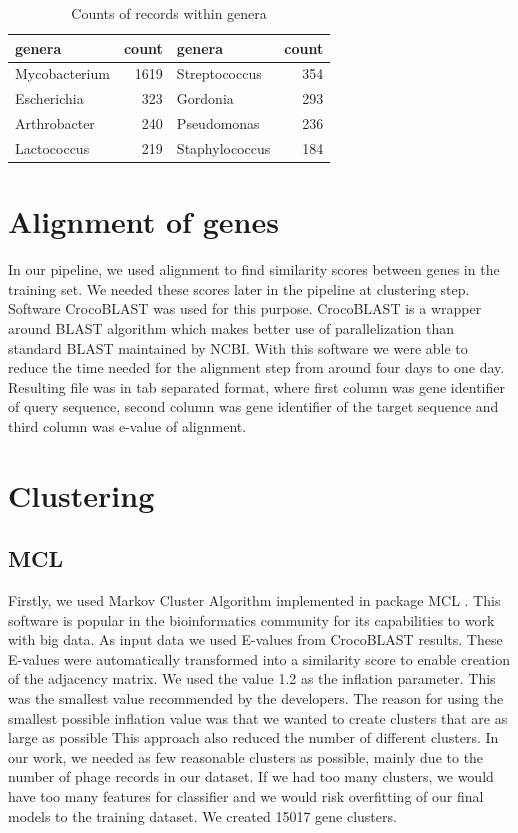 \begin{table}
 \centering
        \begin{tabular}{ l  r  l  r }
         \hline
         genera & count & genera & count \\
         \hline
         Mycobacterium & 1619 & Streptococcus & 354 \\
         Escherichia & 323 & Gordonia & 293 \\
         Arthrobacter & 240 & Pseudomonas & 236 \\
         Lactococcus & 219 & Staphylococcus & 184 \\
         \hline
        \end{tabular}
        \caption{Counts of records within genera}
        \label{tab:counts}
\end{table}

\section{Alignment of genes}
In our pipeline, we used alignment to find similarity scores between genes in the training set.
We needed these scores later in the pipeline at clustering step.
Software CrocoBLAST \cite{crocoblast} was used for this purpose.
CrocoBLAST is a wrapper around BLAST algorithm which makes better use of parallelization than standard BLAST maintained by NCBI.
With this software we were able to reduce the time needed for the alignment step from around four days to one day.
Resulting file was in tab separated format, where first column was gene identifier of query sequence, second column was gene identifier of the target sequence and third column was e-value of alignment.

\section{Clustering}
\subsection{MCL}
Firstly, we used Markov Cluster Algorithm implemented in package MCL \cite{mcl}.
This software is popular in the bioinformatics community for its capabilities to work with big data.
As input data we used E-values from CrocoBLAST results.
These E-values were automatically transformed into a similarity score to enable creation of the adjacency matrix.
We used the value 1.2 as the inflation parameter.
This was the smallest value recommended by the developers.
The reason for using the smallest possible inflation value was that we wanted to create clusters that are as large as possible
This approach also reduced the number of different clusters.
In our work, we needed as few reasonable clusters as possible, mainly due to the number of phage records in our dataset.
If we had too many clusters, we would have too many features for classifier and we would risk overfitting of our final models to the training dataset.
We created 15017 gene clusters.

